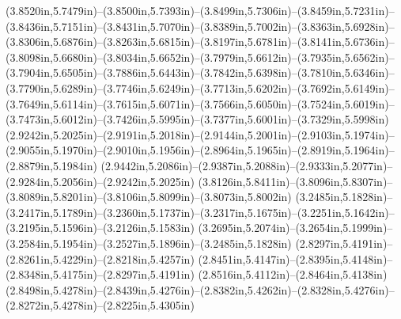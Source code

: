 (3.8520in,5.7479in)--(3.8500in,5.7393in)--(3.8499in,5.7306in)--(3.8459in,5.7231in)--(3.8436in,5.7151in)--(3.8431in,5.7070in)--(3.8389in,5.7002in)--(3.8363in,5.6928in)--(3.8306in,5.6876in)--(3.8263in,5.6815in)--(3.8197in,5.6781in)--(3.8141in,5.6736in)--(3.8098in,5.6680in)--(3.8034in,5.6652in)--(3.7979in,5.6612in)--(3.7935in,5.6562in)--(3.7904in,5.6505in)--(3.7886in,5.6443in)--(3.7842in,5.6398in)--(3.7810in,5.6346in)--(3.7790in,5.6289in)--(3.7746in,5.6249in)--(3.7713in,5.6202in)--(3.7692in,5.6149in)--(3.7649in,5.6114in)--(3.7615in,5.6071in)--(3.7566in,5.6050in)--(3.7524in,5.6019in)--(3.7473in,5.6012in)--(3.7426in,5.5995in)--(3.7377in,5.6001in)--(3.7329in,5.5998in) (2.9242in,5.2025in)--(2.9191in,5.2018in)--(2.9144in,5.2001in)--(2.9103in,5.1974in)--(2.9055in,5.1970in)--(2.9010in,5.1956in)--(2.8964in,5.1965in)--(2.8919in,5.1964in)--(2.8879in,5.1984in) (2.9442in,5.2086in)--(2.9387in,5.2088in)--(2.9333in,5.2077in)--(2.9284in,5.2056in)--(2.9242in,5.2025in) (3.8126in,5.8411in)--(3.8096in,5.8307in)--(3.8089in,5.8201in)--(3.8106in,5.8099in)--(3.8073in,5.8002in) (3.2485in,5.1828in)--(3.2417in,5.1789in)--(3.2360in,5.1737in)--(3.2317in,5.1675in)--(3.2251in,5.1642in)--(3.2195in,5.1596in)--(3.2126in,5.1583in) (3.2695in,5.2074in)--(3.2654in,5.1999in)--(3.2584in,5.1954in)--(3.2527in,5.1896in)--(3.2485in,5.1828in) (2.8297in,5.4191in)--(2.8261in,5.4229in)--(2.8218in,5.4257in) (2.8451in,5.4147in)--(2.8395in,5.4148in)--(2.8348in,5.4175in)--(2.8297in,5.4191in) (2.8516in,5.4112in)--(2.8464in,5.4138in) (2.8498in,5.4278in)--(2.8439in,5.4276in)--(2.8382in,5.4262in)--(2.8328in,5.4276in)--(2.8272in,5.4278in)--(2.8225in,5.4305in)
